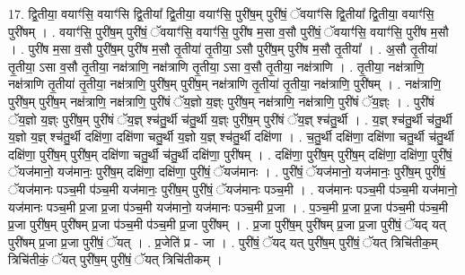 \documentclass[17pt]{extarticle}
\begin{document}
17. द्वि॒तीया॒ वयाꣳ॑सि॒ वयाꣳ॑सि द्वि॒तीया᳚ द्वि॒तीया॒ वयाꣳ॑सि॒ पुरी॑ष॒म् पुरी॑षं॒ ॅवयाꣳ॑सि द्वि॒तीया᳚ द्वि॒तीया॒ वयाꣳ॑सि॒ पुरी॑षम् । . वयाꣳ॑सि॒ पुरी॑ष॒म् पुरी॑षं॒ ॅवयाꣳ॑सि॒ वयाꣳ॑सि॒ पुरी॑ष म॒सा व॒सौ पुरी॑षं॒ ॅवयाꣳ॑सि॒ वयाꣳ॑सि॒ पुरी॑ष म॒सौ । . पुरी॑ष म॒सा व॒सौ पुरी॑ष॒म् पुरी॑ष म॒सौ तृ॒तीया॑ तृ॒तीया॒ ऽसौ पुरी॑ष॒म् पुरी॑ष म॒सौ तृ॒तीया᳚ । . अ॒सौ तृ॒तीया॑ तृ॒तीया॒ ऽसा व॒सौ तृ॒तीया॒ नक्ष॑त्राणि॒ नक्ष॑त्राणि तृ॒तीया॒ ऽसा व॒सौ तृ॒तीया॒ नक्ष॑त्राणि । . तृ॒तीया॒ नक्ष॑त्राणि॒ नक्ष॑त्राणि तृ॒तीया॑ तृ॒तीया॒ नक्ष॑त्राणि॒ पुरी॑ष॒म् पुरी॑ष॒म् नक्ष॑त्राणि तृ॒तीया॑ तृ॒तीया॒ नक्ष॑त्राणि॒ पुरी॑षम् । . नक्ष॑त्राणि॒ पुरी॑ष॒म् पुरी॑ष॒म् नक्ष॑त्राणि॒ नक्ष॑त्राणि॒ पुरी॑षं ॅय॒ज्ञो य॒ज्ञ्ः पुरी॑ष॒म् नक्ष॑त्राणि॒ नक्ष॑त्राणि॒ पुरी॑षं ॅय॒ज्ञ्ः । . पुरी॑षं ॅय॒ज्ञो य॒ज्ञ्ः पुरी॑ष॒म् पुरी॑षं ॅय॒ज्ञ् श्च॑तु॒र्थी च॑तु॒र्थी य॒ज्ञ्ः पुरी॑ष॒म् पुरी॑षं ॅय॒ज्ञ् श्च॑तु॒र्थी । . य॒ज्ञ् श्च॑तु॒र्थी च॑तु॒र्थी य॒ज्ञो य॒ज्ञ् श्च॑तु॒र्थी दक्षि॑णा॒ दक्षि॑णा चतु॒र्थी य॒ज्ञो य॒ज्ञ् श्च॑तु॒र्थी दक्षि॑णा । . च॒तु॒र्थी दक्षि॑णा॒ दक्षि॑णा चतु॒र्थी च॑तु॒र्थी दक्षि॑णा॒ पुरी॑ष॒म् पुरी॑ष॒म् दक्षि॑णा चतु॒र्थी च॑तु॒र्थी दक्षि॑णा॒ पुरी॑षम् । . दक्षि॑णा॒ पुरी॑ष॒म् पुरी॑ष॒म् दक्षि॑णा॒ दक्षि॑णा॒ पुरी॑षं॒ ॅयज॑मानो॒ यज॑मानः॒ पुरी॑ष॒म् दक्षि॑णा॒ दक्षि॑णा॒ पुरी॑षं॒ ॅयज॑मानः । . पुरी॑षं॒ ॅयज॑मानो॒ यज॑मानः॒ पुरी॑ष॒म् पुरी॑षं॒ ॅयज॑मानः पञ्च॒मी प॑ञ्च॒मी यज॑मानः॒ पुरी॑ष॒म् पुरी॑षं॒ ॅयज॑मानः पञ्च॒मी । . यज॑मानः पञ्च॒मी प॑ञ्च॒मी यज॑मानो॒ यज॑मानः पञ्च॒मी प्र॒जा प्र॒जा प॑ञ्च॒मी यज॑मानो॒ यज॑मानः पञ्च॒मी प्र॒जा । . प॒ञ्च॒मी प्र॒जा प्र॒जा प॑ञ्च॒मी प॑ञ्च॒मी प्र॒जा पुरी॑ष॒म् पुरी॑षम् प्र॒जा प॑ञ्च॒मी प॑ञ्च॒मी प्र॒जा पुरी॑षम् । . प्र॒जा पुरी॑ष॒म् पुरी॑षम् प्र॒जा प्र॒जा पुरी॑षं॒ ॅयद् यत् पुरी॑षम् प्र॒जा प्र॒जा पुरी॑षं॒ ॅयत् । . प्र॒जेति॑ प्र - जा । . पुरी॑षं॒ ॅयद् यत् पुरी॑ष॒म् पुरी॑षं॒ ॅयत् त्रिचि॑तीक॒म् त्रिचि॑तीकं॒ ॅयत् पुरी॑ष॒म् पुरी॑षं॒ ॅयत् त्रिचि॑तीकम् । \newline
\end{document}
